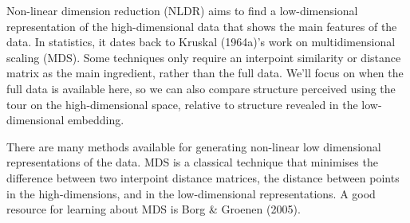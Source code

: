 \documentclass[
  letterpaper,
]{book}
\newenvironment{Shaded}{\begin{snugshade}}{\end{snugshade}}
\newcommand{\AttributeTok}[1]{\textcolor[rgb]{0.40,0.45,0.13}{#1}}
\newcommand{\DecValTok}[1]{\textcolor[rgb]{0.68,0.00,0.00}{#1}}
\newcommand{\FunctionTok}[1]{\textcolor[rgb]{0.28,0.35,0.67}{#1}}
\newcommand{\NormalTok}[1]{\textcolor[rgb]{0.00,0.23,0.31}{#1}}
\newcommand{\OtherTok}[1]{\textcolor[rgb]{0.00,0.23,0.31}{#1}}
\newcommand{\SpecialCharTok}[1]{\textcolor[rgb]{0.37,0.37,0.37}{#1}}
\newcommand{\StringTok}[1]{\textcolor[rgb]{0.13,0.47,0.30}{#1}}
\begin{document}
Non-linear dimension reduction (NLDR) aims to find a low-dimensional
representation of the high-dimensional data that shows the main features
of the data. In statistics, it dates back to Kruskal (1964a)'s work on
multidimensional scaling (MDS). Some techniques only require an
interpoint similarity or distance matrix as the main ingredient, rather
than the full data. We'll focus on when the full data is available here,
so we can also compare structure perceived using the tour on the
high-dimensional space, relative to structure revealed in the
low-dimensional embedding.

There are many methods available for generating non-linear low
dimensional representations of the data. MDS is a classical technique
that minimises the difference between two interpoint distance matrices,
the distance between points in the high-dimensions, and in the
low-dimensional representations. A good resource for learning about MDS
is Borg \& Groenen (2005).

\begin{Shaded}
\end{Shaded}
\end{document}
